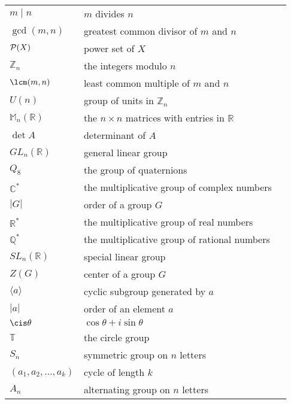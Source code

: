 \begin{center}
\begin{longtable}{llr}
%
$m \mid n$ & $m$ divides $n$ & \pageref{divides} \\
%
$\gcd(m, n)$ & greatest common divisor of $m$ and $n$ & \pageref{greatestcd}\\
%
${\cal P}(X)$ & power set of $X$ & \pageref{powerset} \\
%
${\mathbb Z}_n$ & the integers modulo $n$ & \pageref{integersmodn} \\
%
$\lcm(m,n)$ & least common multiple of $m$ and $n$ & \pageref{leastcm} \\
%
$U(n)$ & group of units in ${\mathbb Z}_n$ & \pageref{groupofunits} \\
%
${\mathbb M}_n ( {\mathbb R})$ & the $n \times n$ matrices with entries in ${\mathbb R}$ &  \pageref{notematrices} \\
%
$\det A$ & determinant of $A$ & \pageref{determinant} \\
%
$GL_n({\mathbb R})$ & general linear group & \pageref{generallinear} \\
%
$Q_8$ & the group of quaternions & \pageref{notequateriongroup} \\
%
${\mathbb C}^\ast$ & the multiplicative group of complex numbers & \pageref{noteCstar} \\
%
$|G|$ & order of a group $G$ & \pageref{noteorder} \\
%
${\mathbb R}^*$ & the multiplicative group of real numbers & \pageref{noteRstar} \\
%
${\mathbb Q}^*$ & the multiplicative group of rational numbers & \pageref{noteQstar} \\
%
$SL_n({\mathbb R})$ & special linear group & \pageref{speciallinear} \\
%
$Z(G)$ & center of a group $G$ & \pageref{centerofagroup} \\
%
$\langle a \rangle$ & cyclic subgroup generated by $a$ & \pageref{generatedby} \\
%
$|a|$ & order of an element $a$ & \pageref{noteelementorder} \\
%
$\cis \theta$ & $\cos \theta + i \sin \theta$ & \pageref{cosisin} \\
%
${\mathbb T}$ & the circle group & \pageref{notecirclegroup} \\
%
$S_n$ & symmetric group on $n$ letters & \pageref{symmetricgroup} \\
%
$(a_1, a_2, \ldots, a_k )$ & cycle of length $k$ & \pageref{notecycle} \\
%
$A_n$ & alternating group on $n$ letters & \pageref{alternatinggroup} \\

\end{longtable}
\end{center}
